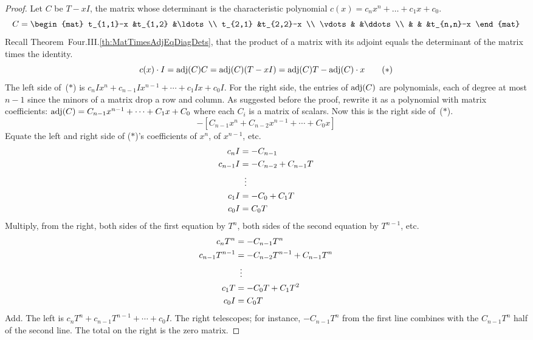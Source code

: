 \begin{proof}
Let \( C \) be \( T-xI \),
the matrix whose determinant is the characteristic polynomial
\( c(x)=c_nx^n+\dots+c_1x+c_0 \).
\begin{equation*}
  C=\begin{mat}
    t_{1,1}-x        &t_{1,2}   &\ldots        \\
    t_{2,1}          &t_{2,2}-x               \\
    \vdots           &          &\ddots       \\
                     &          &       &t_{n,n}-x
  \end{mat}
\end{equation*}
Recall Theorem~Four.III.\ref{th:MatTimesAdjEqDiagDets},
that the product of a matrix with its adjoint equals
the determinant of the matrix times the identity.
\begin{equation*}
  c(x)\cdot I
  =\operatorname{adj} (C)C
  =\operatorname{adj} (C)(T-xI)
  =\operatorname{adj} (C)T- \operatorname{adj}(C)\cdot x
\tag*{($*$)}
\end{equation*}
The left side of~($*$) is 
$c_nIx^n+c_{n-1}Ix^{n-1}+\cdots+c_1Ix+c_0I$.
For the right side,
the entries of \( \operatorname{adj} (C) \) are polynomials, each of degree
at most \( n-1 \) since the minors of a matrix drop a row and column.
As suggested before the proof, rewrite it as a polynomial with
matrix coefficients:
\( \operatorname{adj} (C)=C_{n-1}x^{n-1}+\cdots+C_1x+C_0 \)
where each \( C_i \) is a matrix of scalars.
Now this is the right side of~($*$).
\begin{equation*}
  [(C_{n-1}T)x^{n-1}+\cdots+(C_1T)x+C_0T]  
   -[C_{n-1}x^n+C_{n-2}x^{n-1}+\cdots+C_0x]
\end{equation*}
Equate the left and right side of ($*$)'s
coefficients of \( x^n \), of $x^{n-1}$, etc.
\begin{align*}
  c_nI
  &=-C_{n-1}    \\
  c_{n-1}I
  &=-C_{n-2}+C_{n-1}T    \\
  &\vdotswithin{=}             \\
  c_{1}I
  &=-C_{0}+C_{1}T    \\
  c_{0}I
  &=C_{0}T
\end{align*}
Multiply, from the right, both sides of the first equation by \( T^n \), 
both sides of the second equation by \( T^{n-1} \), etc.
\begin{align*}
  c_nT^n
  &=-C_{n-1}T^n    \\
  c_{n-1}T^{n-1}
  &=-C_{n-2}T^{n-1}+C_{n-1}T^n    \\
  &\vdotswithin{=}             \\
  c_{1}T
  &=-C_{0}T+C_{1}T^2    \\
  c_{0}I
  &=C_{0}T
\end{align*}
Add.
The left is 
\( c_nT^n+c_{n-1}T^{n-1}+\cdots+c_0I \). 
The right telescopes;
for instance, $-C_{n-1}T^n$ from the first line combines with the 
$C_{n-1}T^n$ half of the second line. 
The total on the right is the zero matrix.
\end{proof}


